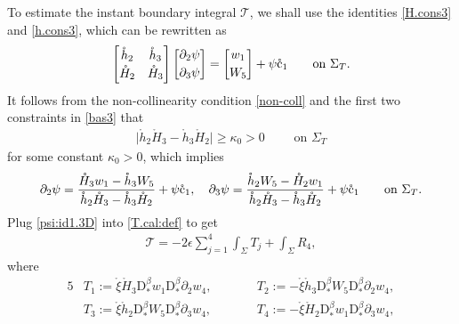 \documentclass[twoside,11pt]{article}
\numberwithin{equation}{section}
\def\p{\partial}
\begin{document}
To estimate the instant boundary integral $\mathcal{T}$, we shall use the identities \eqref{H.cons3} and \eqref{h.cons3}, which can be rewritten as
\begin{align}
	\nonumber
	\begin{bmatrix}
		\mathring{h}_2 & \mathring{h}_3\\[0.5mm]
		\mathring{H}_2 & \mathring{H}_3
	\end{bmatrix}
	\begin{bmatrix}
		\p_2\psi \\[0.8mm] \p_3\psi
	\end{bmatrix}
	=\begin{bmatrix}
		w_1 \\[0.8mm] W_5
	\end{bmatrix}
	+\psi \mathring{\rm c}_1
	\qquad\textrm{on }\Sigma_{T}.
\end{align}
{It follows from the non-collinearity condition \eqref{non-coll} and the first two constraints in \eqref{bas3} that}
\begin{align} \label{stab1.3D}
	\big|\mathring{h}_2\mathring{H}_3  - \mathring{h}_3\mathring{H}_2\big|\geq \kappa_0>0  \qquad\textrm{ on }\Sigma_{T}
\end{align}
for some constant $\kappa_0>0$, which implies
\begin{align}
	\p_2\psi =\frac{\mathring{H}_3 w_1 -\mathring{h}_3W_5}{\mathring{h}_2\mathring{H}_3 -\mathring{h}_3\mathring{H}_2}+\psi \mathring{\rm c}_1,
	\quad
	\p_3\psi =\frac{\mathring{h}_2W_5-\mathring{H}_2 w_1}{\mathring{h}_2\mathring{H}_3 -\mathring{h}_3\mathring{H}_2}+\psi \mathring{\rm c}_1
	\qquad\textrm{on }\Sigma_{T}.
	\label{psi:id1.3D}		
\end{align}
Plug \eqref{psi:id1.3D} into \eqref{T.cal:def} to get
\begin{align}
	\mathcal{T}	= 		-2\epsilon \sum_{j=1}^{4} \int_{\Sigma} T_j		+\int_{\Sigma} R_4,
	\label{Q:es2}
\end{align}
where
\begin{alignat*}{5}
	&T_1:=\mathring{\xi} \mathring{H}_3 \mathrm{D}_*^{\beta}w_1  	\mathrm{D}_*^{\beta} \p_2{w_4},
	\qquad &&
	T_2:=-\mathring{\xi}
	\mathring{h}_3 \mathrm{D}_*^{\beta}W_5
	\mathrm{D}_*^{\beta} \p_2{w_4},\\[0.5mm]
	&T_3:=\mathring{\xi} \mathring{h}_2\mathrm{D}_*^{\beta}W_5
	\mathrm{D}_*^{\beta} \p_3{w_4},
	\qquad &&
	T_4:=-\mathring{\xi} 	 \mathring{H}_2\mathrm{D}_*^{\beta}w_1
	\mathrm{D}_*^{\beta} \p_3{w_4},
\end{alignat*}
\end{document}
